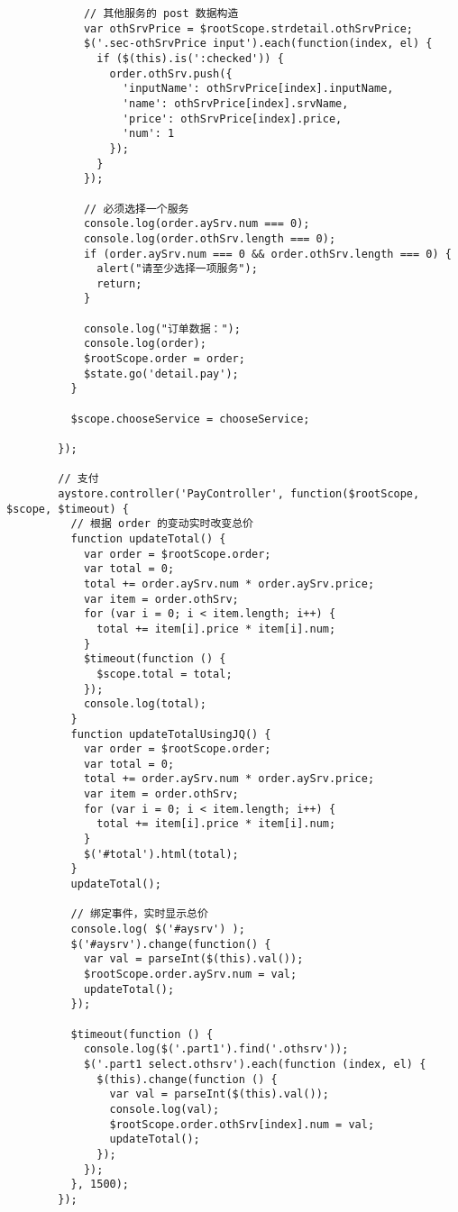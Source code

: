 \begin{lstlisting}
            // 其他服务的 post 数据构造
            var othSrvPrice = $rootScope.strdetail.othSrvPrice;
            $('.sec-othSrvPrice input').each(function(index, el) {
              if ($(this).is(':checked')) {
                order.othSrv.push({
                  'inputName': othSrvPrice[index].inputName,
                  'name': othSrvPrice[index].srvName,
                  'price': othSrvPrice[index].price,
                  'num': 1
                });
              }
            });

            // 必须选择一个服务
            console.log(order.aySrv.num === 0);
            console.log(order.othSrv.length === 0);
            if (order.aySrv.num === 0 && order.othSrv.length === 0) {
              alert("请至少选择一项服务");
              return;
            }

            console.log("订单数据：");
            console.log(order);
            $rootScope.order = order;
            $state.go('detail.pay');
          }

          $scope.chooseService = chooseService;

        });

        // 支付
        aystore.controller('PayController', function($rootScope, $scope, $timeout) {
          // 根据 order 的变动实时改变总价
          function updateTotal() {
            var order = $rootScope.order;
            var total = 0;
            total += order.aySrv.num * order.aySrv.price;
            var item = order.othSrv;
            for (var i = 0; i < item.length; i++) {
              total += item[i].price * item[i].num;
            }
            $timeout(function () {
              $scope.total = total;
            });
            console.log(total);
          }
          function updateTotalUsingJQ() {
            var order = $rootScope.order;
            var total = 0;
            total += order.aySrv.num * order.aySrv.price;
            var item = order.othSrv;
            for (var i = 0; i < item.length; i++) {
              total += item[i].price * item[i].num;
            }
            $('#total').html(total);
          }
          updateTotal();

          // 绑定事件，实时显示总价
          console.log( $('#aysrv') );
          $('#aysrv').change(function() {
            var val = parseInt($(this).val());
            $rootScope.order.aySrv.num = val;
            updateTotal();
          });

          $timeout(function () {
            console.log($('.part1').find('.othsrv'));
            $('.part1 select.othsrv').each(function (index, el) {
              $(this).change(function () {
                var val = parseInt($(this).val());
                console.log(val);
                $rootScope.order.othSrv[index].num = val;
                updateTotal();
              });
            });
          }, 1500);
        });
      \end{lstlisting}

